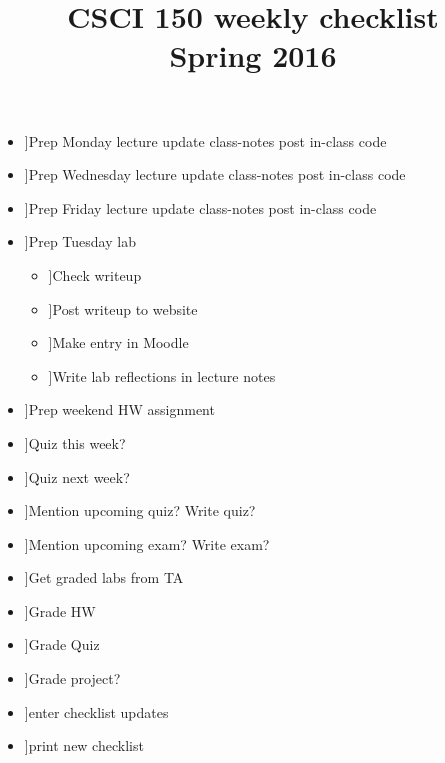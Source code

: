 \documentclass{article}
\title{CSCI 150 weekly checklist \\ {\small Spring 2016}}
\date{}
\newcommand{\cbox}{\framebox[1em]{\phantom{x}}}
\newcommand{\ci}{\item[\cbox]}
\newcommand{\also}{\cbox \hspace{1ex}}
\begin{document}
\maketitle
\thispagestyle{empty}

\begin{itemize}
\ci Prep Monday lecture \also update class-notes \also post in-class code
\ci Prep Wednesday lecture \also update class-notes \also post in-class code
\ci Prep Friday lecture \also update class-notes \also post in-class code \\

\ci Prep Tuesday lab
\begin{itemize}
\ci Check writeup
\ci Post writeup to website
\ci Make entry in Moodle
\ci Write lab reflections in lecture notes
\end{itemize}
\ci Prep weekend HW assignment \\

\ci Quiz this week?
\ci Quiz next week?
\ci Mention upcoming quiz? \also Write quiz?
\ci Mention upcoming exam? \also Write exam? \\

\ci Get graded labs from TA
\ci Grade HW
\ci Grade Quiz
\ci Grade project? \\

\ci enter checklist updates
\ci print new checklist
\end{itemize}
\end{document}
